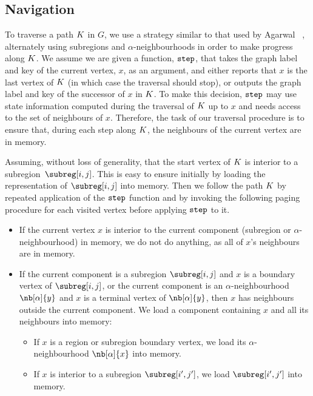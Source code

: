 \subsection{Navigation}

\label{sec:navigation}

To traverse a path $K$ in $G$, we use a strategy similar to that used
by Agarwal \etal~\cite{DBLP:conf/soda/AgarwalAMVV98},
alternately using subregions and $\alpha$-neighbourhoods in order to make
progress along $K$.
We assume we are given a function, $\texttt{step}$, that takes the graph label
and key of the current vertex, $x$, as an argument, and either reports that $x$
is the last vertex of $K$ (in which case the traversal should stop), or outputs
the graph label and key of the successor of $x$ in $K$.
To make this decision, $\texttt{step}$ may
use state information computed during the traversal of $K$ up to $x$
and needs access to the set of neighbours of $x$.
Therefore, the task of our traversal procedure is to ensure that, during each step
along $K$, the neighbours of the current vertex are in memory.

Assuming, without loss of generality, that the start vertex of $K$ is 
interior to a subregion~$\subreg[i,j]$.
This is easy to ensure initially by loading the
representation of $\subreg[i,j]$ into memory.
Then we follow the path $K$ by repeated application of the $\texttt{step}$ function
and by invoking the following paging procedure for each visited vertex before
applying $\texttt{step}$ to it.
\begin{itemize}
\item If the current vertex $x$ is interior to the current component
  (subregion or $\alpha$-neighbourhood) in memory, we do not do
  anything, as all of $x$'s neighbours are in memory.
\item If the current component is a subregion $\subreg[i,j]$ and $x$ is a
  boundary vertex of $\subreg[i,j]$, or the current component is an
  $\alpha$-neighbourhood $\nb[\alpha]{y}$ and $x$ is a terminal vertex of
  $\nb[\alpha]{y}$, then $x$ has neighbours outside the current
  component.
  We load a component containing $x$ and all its neighbours into memory:
  \begin{itemize}
  \item If $x$ is a region or subregion boundary vertex, we load its
    $\alpha$-neighbourhood $\nb[\alpha]{x}$ into memory.
  \item If $x$ is interior to a subregion $\subreg[i',j']$, we load
    $\subreg[i',j']$ into memory.
  \end{itemize}
\end{itemize}

